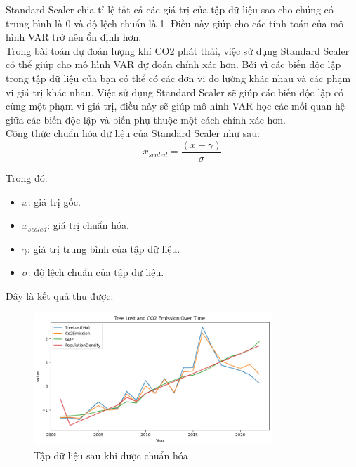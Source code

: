 \documentclass[a4paper,12pt]{report}
\begin{document}
\begin{flushleft}
	Standard Scaler chia tỉ lệ tất cả các giá trị của tập dữ liệu sao cho chúng có trung bình là 0 và độ lệch chuẩn là 1. Điều này giúp cho các tính toán của mô hình VAR trở nên ổn định hơn.
	\\[\baselineskip]

	Trong bài toán dự đoán lượng khí CO2 phát thải, việc sử dụng Standard Scaler có thể giúp cho mô hình VAR dự đoán chính xác hơn. Bởi vì các biến độc lập trong tập dữ liệu của bạn có thể có các đơn vị đo lường khác nhau và các phạm vi giá trị khác nhau. Việc sử dụng Standard Scaler sẽ giúp các biến độc lập có cùng một phạm vi giá trị, điều này sẽ giúp mô hình VAR học các mối quan hệ giữa các biến độc lập và biến phụ thuộc một cách chính xác hơn.
	\\[\baselineskip]

	Công thức chuẩn hóa dữ liệu của Standard Scaler như sau:
	$$
		x_{scaled} = \frac{(x - \gamma)}{\sigma}
	$$

	Trong đó:
	\begin{itemize}
		\item $x$: giá trị gốc.

		\item $x_{scaled}$: giá trị chuẩn hóa.

		\item $\gamma$: giá trị trung bình của tập dữ liệu.

		\item $\sigma$: độ lệch chuẩn của tập dữ liệu.
	\end{itemize}

	Đây là kết quả thu được:
	\begin{figure}[H]
		\centering
		\includegraphics[width = 0.8\textwidth]{images/standard_scaler.png}
		\caption{Tập dữ liệu sau khi được chuẩn hóa}
	\end{figure}


\end{flushleft}
\end{document}
